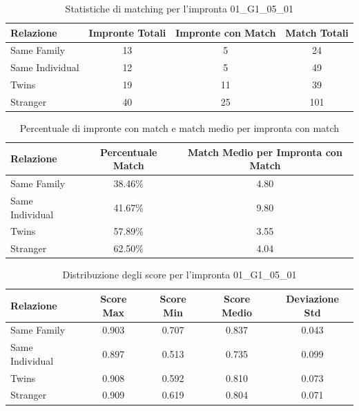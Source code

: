 \begin{table}[htbp]
\centering
\caption{Statistiche di matching per l'impronta 01\_G1\_05\_01}
\label{tab:results_01_G1_05_01}
\begin{tabular}{|l|c|c|c|}
\hline
\textbf{Relazione} & \textbf{Impronte Totali} & \textbf{Impronte con Match} & \textbf{Match Totali} \\
\hline
Same Family & 13 & 5 & 24 \\
\hline
Same Individual & 12 & 5 & 49 \\
\hline
Twins & 19 & 11 & 39 \\
\hline
Stranger & 40 & 25 & 101 \\
\hline
\end{tabular}
\end{table}


\begin{table}[htbp]
\centering
\caption{Percentuale di impronte con match e match medio per impronta con match}
\label{tab:match_percentage_01_G1_05_01}
\begin{tabular}{|l|c|c|}
\hline
\textbf{Relazione} & \textbf{Percentuale Match} & \textbf{Match Medio per Impronta con Match} \\
\hline
Same Family & 38.46\% & 4.80 \\
\hline
Same Individual & 41.67\% & 9.80 \\
\hline
Twins & 57.89\% & 3.55 \\
\hline
Stranger & 62.50\% & 4.04 \\
\hline
\end{tabular}
\end{table}


\begin{table}[htbp]
\centering
\caption{Distribuzione degli score per l'impronta 01\_G1\_05\_01}
\label{tab:scores_01_G1_05_01}
\begin{tabular}{|l|c|c|c|c|}
\hline
\textbf{Relazione} & \textbf{Score Max} & \textbf{Score Min} & \textbf{Score Medio} & \textbf{Deviazione Std} \\
\hline
Same Family & 0.903 & 0.707 & 0.837 & 0.043 \\
\hline
Same Individual & 0.897 & 0.513 & 0.735 & 0.099 \\
\hline
Twins & 0.908 & 0.592 & 0.810 & 0.073 \\
\hline
Stranger & 0.909 & 0.619 & 0.804 & 0.071 \\
\hline
\end{tabular}
\end{table}

